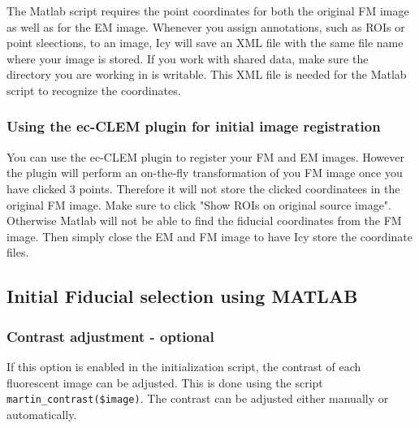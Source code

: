 \documentclass[10pt,a4paper,onepage,DIV12]{scrartcl}
\begin{document}
The Matlab script requires the point coordinates for both the original FM image as well as for the EM image. Whenever you assign annotations, such as ROIs or point sleections, to an image, Icy will save an XML file with the same file name where your image is stored. If you work with shared data, make sure the directory you are working in is writable. This XML file is needed for the Matlab script to recognize the coordinates.

\subsubsection{Using the ec-CLEM plugin for initial image registration}
You can use the ec-CLEM plugin to register your FM and EM images. However the plugin will perform an on-the-fly transformation of you FM image once you have clicked 3 points. Therefore it will not store the clicked coordinatees in the original FM image.
Make sure to click "Show ROIs on original source image". Otherwise Matlab will not be able to find the fiducial coordinates from the FM image. Then simply close the EM and FM image to have Icy store the coordinate files.

\subsection{Initial Fiducial selection using MATLAB}
\label{matlabsel}
\subsubsection{Contrast adjustment - optional}
If this option is enabled in the initialization script, the contrast of each fluorescent image can be adjusted. This is done using the script \verb|martin_contrast($image)|. The contrast can be adjusted either manually or automatically.
\end{document}
